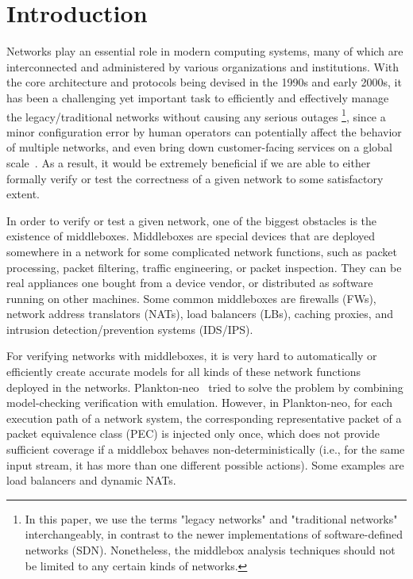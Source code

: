 \section{Introduction}

Networks play an essential role in modern computing systems, many of which are
interconnected and administered by various organizations and institutions. With
the core architecture and protocols being devised in the 1990s and early 2000s,
it has been a challenging yet important task to efficiently and effectively
manage the legacy/traditional networks without causing any serious outages
\footnote{In this paper, we use the terms "legacy networks" and "traditional
networks" interchangeably, in contrast to the newer implementations of
software-defined networks (SDN). Nonetheless, the middlebox analysis techniques
should not be limited to any certain kinds of networks.}, since a minor
configuration error by human operators can potentially affect the behavior of
multiple networks, and even bring down customer-facing services on a global
scale~\cite{2017-Newton,2018-Speed}. As a result, it would be extremely
beneficial if we are able to either formally verify or test the correctness of a
given network to some satisfactory extent.

In order to verify or test a given network, one of the biggest obstacles is the
existence of middleboxes. Middleboxes are special devices that are deployed
somewhere in a network for some complicated network functions, such as packet
processing, packet filtering, traffic engineering, or packet inspection. They
can be real appliances one bought from a device vendor, or distributed as
software running on other machines. Some common middleboxes are firewalls (FWs),
network address translators (NATs), load balancers (LBs), caching proxies, and
intrusion detection/prevention systems (IDS/IPS).

For verifying networks with middleboxes, it is very hard to automatically or
efficiently create accurate models for all kinds of these network functions
deployed in the networks. Plankton-neo~\cite{2018-PrabhuEtAl} tried to solve the
problem by combining model-checking verification with emulation. However, in
Plankton-neo, for each execution path of a network system, the corresponding
representative packet of a packet equivalence class (PEC) is injected only once,
which does not provide sufficient coverage if a middlebox behaves
non-deterministically (i.e., for the same input stream, it has more than one
different possible actions). Some examples are load balancers and dynamic NATs.

